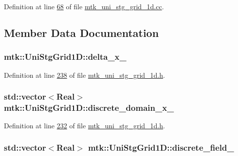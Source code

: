 Definition at line \hyperlink{mtk__uni__stg__grid__1d_8cc_source_l00068}{68} of file \hyperlink{mtk__uni__stg__grid__1d_8cc_source}{mtk\+\_\+uni\+\_\+stg\+\_\+grid\+\_\+1d.\+cc}.



\subsection{Member Data Documentation}
\hypertarget{classmtk_1_1UniStgGrid1D_a12577bbe0b88e9a0ac9b2267f2fcc48c}{
\subsubsection[{delta\+\_\+x\+\_\+}]{ mtk\+::\+Uni\+Stg\+Grid1\+D\+::delta\+\_\+x\+\_\+\hspace{0.3cm}{\ttfamily [private]}}}\label{classmtk_1_1UniStgGrid1D_a12577bbe0b88e9a0ac9b2267f2fcc48c}


Definition at line \hyperlink{mtk__uni__stg__grid__1d_8h_source_l00238}{238} of file \hyperlink{mtk__uni__stg__grid__1d_8h_source}{mtk\+\_\+uni\+\_\+stg\+\_\+grid\+\_\+1d.\+h}.

\hypertarget{classmtk_1_1UniStgGrid1D_a0a1f9c00e21659e05f414dd97e2a52e3}{
\subsubsection[{discrete\+\_\+domain\+\_\+x\+\_\+}]{\setlength{\rightskip}{0pt plus 5cm}std\+::vector$<${\bf Real}$>$ mtk\+::\+Uni\+Stg\+Grid1\+D\+::discrete\+\_\+domain\+\_\+x\+\_\+\hspace{0.3cm}{\ttfamily [private]}}}\label{classmtk_1_1UniStgGrid1D_a0a1f9c00e21659e05f414dd97e2a52e3}


Definition at line \hyperlink{mtk__uni__stg__grid__1d_8h_source_l00232}{232} of file \hyperlink{mtk__uni__stg__grid__1d_8h_source}{mtk\+\_\+uni\+\_\+stg\+\_\+grid\+\_\+1d.\+h}.

\hypertarget{classmtk_1_1UniStgGrid1D_a7379a5c6d16210cdd61ffa731bc47edc}{
\subsubsection[{discrete\+\_\+field\+\_\+}]{\setlength{\rightskip}{0pt plus 5cm}std\+::vector$<${\bf Real}$>$ mtk\+::\+Uni\+Stg\+Grid1\+D\+::discrete\+\_\+field\+\_\+\hspace{0.3cm}{\ttfamily [private]}}}\label{classmtk_1_1UniStgGrid1D_a7379a5c6d16210cdd61ffa731bc47edc}


